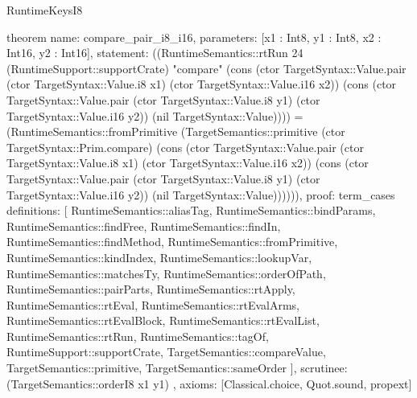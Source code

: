 \begin{lexlean}{RuntimeKeysI8}
\begin{semanticmodule}
theorem{
  name: compare_pair_i8_i16,
  parameters: [x1 : Int8, y1 : Int8, x2 : Int16, y2 : Int16],
  statement: ((RuntimeSemantics::rtRun 24 (RuntimeSupport::supportCrate) "compare" (cons (ctor TargetSyntax::Value.pair (ctor TargetSyntax::Value.i8 x1) (ctor TargetSyntax::Value.i16 x2)) (cons (ctor TargetSyntax::Value.pair (ctor TargetSyntax::Value.i8 y1) (ctor TargetSyntax::Value.i16 y2)) (nil TargetSyntax::Value)))) = (RuntimeSemantics::fromPrimitive (TargetSemantics::primitive (ctor TargetSyntax::Prim.compare) (cons (ctor TargetSyntax::Value.pair (ctor TargetSyntax::Value.i8 x1) (ctor TargetSyntax::Value.i16 x2)) (cons (ctor TargetSyntax::Value.pair (ctor TargetSyntax::Value.i8 y1) (ctor TargetSyntax::Value.i16 y2)) (nil TargetSyntax::Value)))))),
  proof: term_cases{
    definitions: [
      RuntimeSemantics::aliasTag,
      RuntimeSemantics::bindParams,
      RuntimeSemantics::findFree,
      RuntimeSemantics::findIn,
      RuntimeSemantics::findMethod,
      RuntimeSemantics::fromPrimitive,
      RuntimeSemantics::kindIndex,
      RuntimeSemantics::lookupVar,
      RuntimeSemantics::matchesTy,
      RuntimeSemantics::orderOfPath,
      RuntimeSemantics::pairParts,
      RuntimeSemantics::rtApply,
      RuntimeSemantics::rtEval,
      RuntimeSemantics::rtEvalArms,
      RuntimeSemantics::rtEvalBlock,
      RuntimeSemantics::rtEvalList,
      RuntimeSemantics::rtRun,
      RuntimeSemantics::tagOf,
      RuntimeSupport::supportCrate,
      TargetSemantics::compareValue,
      TargetSemantics::primitive,
      TargetSemantics::sameOrder
    ],
    scrutinee: (TargetSemantics::orderI8 x1 y1)
  },
  axioms: [Classical.choice, Quot.sound, propext]
}


\end{semanticmodule}
\end{lexlean}
